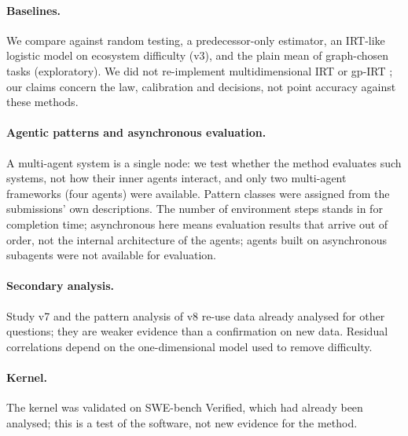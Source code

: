 \documentclass[11pt]{article}
\begin{document}
\paragraph{Baselines.} We compare against random testing, a predecessor-only estimator, an IRT-like logistic model on
ecosystem difficulty (v3), and the plain mean of graph-chosen tasks (exploratory). We did not re-implement
multidimensional IRT or gp-IRT \citep{polo2024tiny,she2026production}; our claims concern the law, calibration and
decisions, not point accuracy against these methods.

\paragraph{Agentic patterns and asynchronous evaluation.} A multi-agent system is a single node: we test whether the
method evaluates such systems, not how their inner agents interact, and only two multi-agent frameworks (four agents)
were available. Pattern classes were assigned from the submissions' own descriptions. The number of environment
steps stands in for completion time; asynchronous here means evaluation results that arrive out of order, not the
internal architecture of the agents; agents built on asynchronous subagents were not available for evaluation.

\paragraph{Secondary analysis.} Study v7 and the pattern analysis of v8 re-use data already analysed for other questions; they are weaker evidence than a
confirmation on new data. Residual correlations depend on the one-dimensional model used to remove difficulty.

\paragraph{Kernel.} The kernel was validated on SWE-bench Verified, which had already been analysed; this is a test of
the software, not new evidence for the method.
\end{document}
